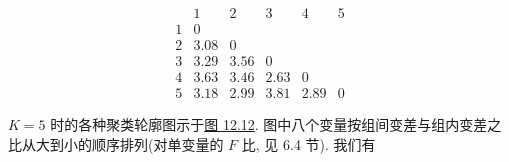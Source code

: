 \begin{mvtable}
\[
\begin{array}{cccccc}
 & 1 & 2 & 3 & 4 & 5\\
1 & 0 & & & & \\
2 & 3.08 & 0 & & & \\
3 & 3.29 & 3.56 & 0 & & \\
4 & 3.63 & 3.46 & 2.63 & 0 & \\
5 & 3.18 & 2.99 & 3.81 & 2.89 & 0
\end{array}
\]
\end{mvtable}

$K=5$ 时的各种聚类轮廓图示于\hyperref[fig:12.12]{图 12.12}. 图中八个变量按组间变差与组内变差之比从大到小的顺序排列(对单变量的 $F$ 比, 见 6.4 节). 我们有
